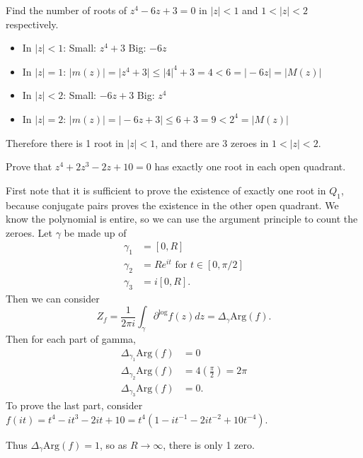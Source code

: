 \documentclass[12pt]{article}
\begin{document}
\begin{statement}
  Find the number of roots of $z^4 - 6z+3=0$ in $\vert z \vert < 1$ and $1 < \vert z \vert < 2$ respectively. 
\end{statement}
\begin{newproof}
  \begin{itemize}
    \item In $\vert z \vert < 1$:
      \subitem Small: $z^4 + 3$
      \subitem Big: $-6z$
    \item In $\vert z \vert = 1$:
      \subitem $\vert m(z) \vert = \vert z^4 + 3 \vert \leq \vert 4 \vert^4 + 3 = 4 < 6 = \vert -6z \vert = \vert M(z) \vert$
    \item In $\vert z \vert < 2$:
      \subitem Small: $-6z+3$
      \subitem Big: $z^4$
    \item In $\vert z \vert = 2$:
      \subitem $\vert m(z) \vert = \vert -6z+3 \vert \leq 6+3=9 < 2^4 = \vert M(z) \vert$
  \end{itemize}
  Therefore there is 1 root in $\vert z \vert < 1$, and there are 3 zeroes in $1 < \vert z \vert < 2$.
\end{newproof}

\begin{statement}
  Prove that $z^4+2z^3-2z+10=0$ has exactly one root in each open quadrant. 
\end{statement}
\begin{newproof}
  First note that it is sufficient to prove the existence of exactly one root in $Q_1$, because conjugate 
  pairs proves the existence in the other open quadrant. We know the polynomial is entire, so we can use the 
  argument principle to count the zeroes. Let $\gamma$ be made up of 
  \begin{align*}
    \gamma_1 &= [0,R] \\
    \gamma_2 &= Re^{it} \text{ for } t \in [0, \pi / 2] \\
    \gamma_ 3 &= i[0,R].
  \end{align*}
  Then we can consider 
  \begin{equation*}
    Z_f = \frac{1}{2\pi i} \int_{\gamma} \partial^{\log} f(z)dz = \Delta_{\gamma}\text{Arg}(f).
  \end{equation*}
  Then for each part of gamma, 
  \begin{align*}
    \Delta_{\gamma_1}\text{Arg}(f) &= 0 \\
    \Delta_{\gamma_2}\text{Arg}(f) &= 4(\frac{\pi}{2}) = 2\pi \\
    \Delta_{\gamma_3}\text{Arg}(f) &=0.
  \end{align*}
  To prove the last part, consider $f(it)=t^4-it^3-2it+10=t^4(1-it^{-1}-2it^{-2}+10t^{-4})$.
  \par Thus $\Delta_{\gamma}\text{Arg}(f)=1$, so as $R \to \infty$, there is only 1 zero. 
\end{newproof}
\end{document}
